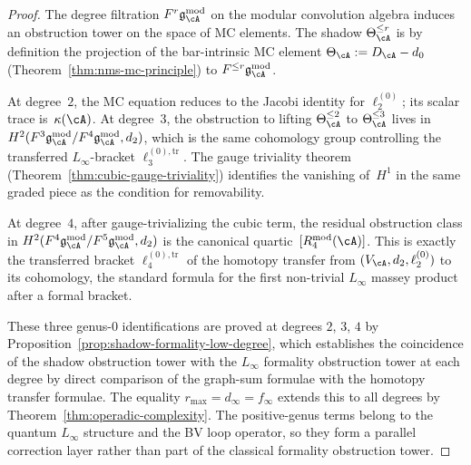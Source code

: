 \begin{proof}
The degree filtration $F^r\gAmod$ on the modular convolution
algebra induces an obstruction tower on the space of MC elements.
The shadow $\Theta_{\cA}^{\leq r}$ is by definition the
projection of the bar-intrinsic MC element
$\Theta_{\cA} := D_{\cA} - d_0$
(Theorem~\ref{thm:nms-mc-principle}) to $F^{\leq r}\gAmod$.

At degree~$2$, the MC equation reduces to the Jacobi identity
for $\ell_2^{(0)}$; its scalar trace is~$\kappa(\cA)$.
At degree~$3$, the obstruction to lifting
$\Theta_{\cA}^{\leq 2}$ to $\Theta_{\cA}^{\leq 3}$
lives in $H^2(F^3\gAmod/F^4\gAmod, d_2)$,
which is the same cohomology group controlling the
transferred $L_\infty$-bracket $\ell_3^{(0),\mathrm{tr}}$.
The gauge triviality theorem
(Theorem~\ref{thm:cubic-gauge-triviality}) identifies
the vanishing of~$H^1$ in the same graded piece as the
condition for removability.

At degree~$4$, after gauge-trivializing the cubic term, the
residual obstruction class in
$H^2(F^4\gAmod/F^5\gAmod, d_2)$
is the canonical quartic~$[R^{\mathrm{mod}}_4(\cA)]$.
This is exactly the transferred bracket
$\ell_4^{(0),\mathrm{tr}}$ of the homotopy transfer
from $(V_{\cA}, d_2, \ell_2^{(0)})$ to its cohomology, the
standard formula for the first non-trivial $L_\infty$ massey
product after a formal bracket.

These three genus-$0$ identifications are proved
at degrees $2$, $3$, $4$ by
Proposition~\ref{prop:shadow-formality-low-degree},
which establishes the coincidence of the shadow obstruction tower with
the $L_\infty$ formality obstruction tower at each degree
by direct comparison of the graph-sum formulae with the
homotopy transfer formulae. The equality
$r_{\max} = d_\infty = f_\infty$ extends this to all degrees
by Theorem~\ref{thm:operadic-complexity}. The positive-genus terms
belong to the quantum $L_\infty$ structure and the BV loop operator,
so they form a parallel correction layer rather than part of the
classical formality obstruction tower.
\end{proof}

